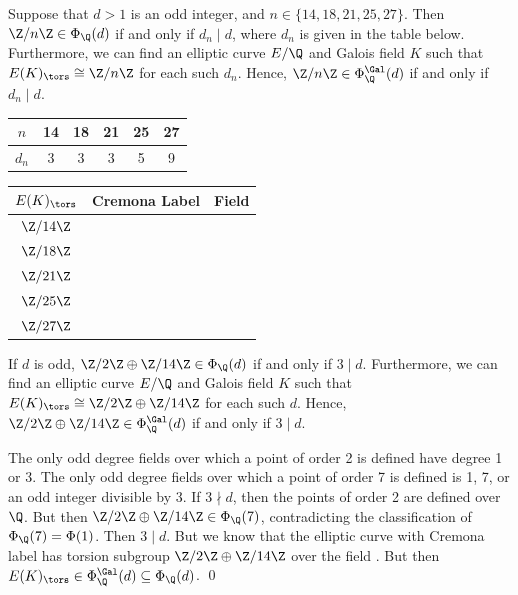 \begin{frame}[plain]
\begin{lem} \label{lem:oddgalfinp}
Suppose that $d > 1$ is an odd integer, and $n \in \{ 14, 18, 21, 25, 27 \}$. Then $\Z/n\Z \in \Phi_\Q(d)$ if and only if $d_n \mid d$, where $d_n$ is given in the table below. Furthermore, we can find an elliptic curve $E/\Q$ and Galois field $K$ such that $E(K)_\tors \cong \Z/n\Z$ for each such $d_n$. Hence, $\Z/n\Z \in \Phi_\Q^{\Gal}(d)$ if and only if $d_n \mid d$.
	\begin{table}[!ht]
	\centering
	\begin{tabular}{|c||ccccc|} \hline
	$n$ & 14 & 18 & 21 & 25 & 27 \\ \hline
	$d_n$ & 3 & 3 & 3 & 5 & 9 \\ \hline
	\end{tabular}
	\end{table}
\end{lem}

	\begin{table}[!ht]
	\centering
	\begin{tabular}{ccc} \hline
	$E(K)_\tors$ & Cremona Label & Field \\ \hline
	$\Z/14\Z$ & \fnaf{} & \qzetasp{} \\ 
	$\Z/18\Z$ & \ffasix{} & \qzetasp{} \\
	$\Z/21\Z$ & \ostbo{} & \qzetanp{} \\ 
	$\Z/25\Z$ & \eeat{} & \qzetaeep{} \\
	$\Z/27\Z$ & \tsaf{} & \qzetatsp{} 
	\end{tabular}
	\end{table}
\end{frame}





\begin{frame}[plain]
\begin{lem} 
If $d$ is odd, $\Z/2\Z \oplus \Z/14\Z \in \Phi_\Q(d)$ if and only if $3 \mid d$. Furthermore, we can find an elliptic curve $E/\Q$ and Galois field $K$ such that $E(K)_\tors \cong \Z/2\Z \oplus \Z/14\Z$ for each such $d$. Hence, $\Z/2\Z \oplus \Z/14\Z \in \Phi_\Q^{\Gal}(d)$ if and only if $3 \mid d$.
\end{lem} \pspace

\pf The only odd degree fields over which a point of order 2 is defined have degree 1 or 3. The only odd degree fields over which a point of order 7 is defined is 1, 7, or an odd integer divisible by 3. If $3 \nmid d$, then the points of order 2 are defined over $\Q$. But then $\Z/2\Z \oplus \Z/14\Z \in \Phi_\Q(7)$, contradicting the classification of $\Phi_\Q(7)= \Phi(1)$. Then $3 \mid d$. But we know that the elliptic curve with Cremona label \onttet{} has torsion subgroup $\Z/2\Z \oplus \Z/14\Z$ over the field \ttnsoo{}. But then $E(K)_\tors \in \Phi_\Q^{\Gal}(d) \subseteq \Phi_\Q(d)$. \hfill\qed
\end{frame}





